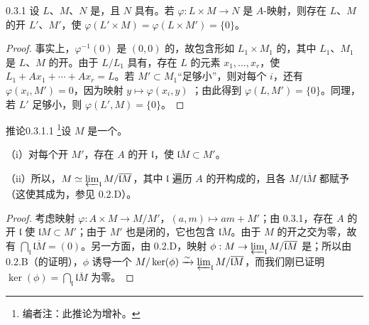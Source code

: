 \begin{SGAresult}{}{0.3.1}
设 $L$、$M$、$N$ 是，且 $N$ 具有。若 $\varphi:L\times M\to N$ 是 $A$-映射，则存在 $L$、$M$ 的开 $L'$、$M'$，使 $\varphi(L'\times M)=\varphi(L\times M')=\{0\}$。
\end{SGAresult}
\begin{proof}
事实上，$\varphi^{-1}(0)$ 是 $(0,0)$ 的，故包含形如 $L_1\times M_1$ 的，其中 $L_1$、$M_1$ 是 $L$、$M$ 的开。由于 $L/L_1$ 具有，存在 $L$ 的元素 $x_1,\ldots,x_r$，使 $L_1+Ax_1+\cdots+Ax_r=L$。若 $M'\subset M_1$“足够小”，则对每个 $i$，还有 $\varphi(x_i,M')=0$，因为映射 $y\mapsto\varphi(x_i,y)$ ；由此得到 $\varphi(L,M')=\{0\}$。同理，若 $L'$ 足够小，则 $\varphi(L',M)=\{0\}$。
\end{proof}
\begin{SGAresult}{推论}{0.3.1.1}
\footnote{编者注：此推论为增补。}设 $M$ 是一个。

（i）对每个开 $M'$，存在 $A$ 的开 $\mathfrak l$，使 $\overline{\mathfrak lM}\subset M'$。

（ii）所以，$M\simeq\varprojlim_{\mathfrak l}M/\overline{\mathfrak lM}$，其中 $\mathfrak l$ 遍历 $A$ 的开构成的，且各 $M/\overline{\mathfrak lM}$ 都赋予（这使其成为，参见 0.2.D）。
\end{SGAresult}
\begin{proof}
考虑映射 $\varphi:A\times M\to M/M'$，$(a,m)\mapsto am+M'$；由 0.3.1，存在 $A$ 的开 $\mathfrak l$ 使 $\mathfrak lM\subset M'$；由于 $M'$ 也是闭的，它也包含 $\overline{\mathfrak lM}$。由于 $M$ 的开之交为零，故有 $\bigcap_{\mathfrak l}\overline{\mathfrak lM}=(0)$。另一方面，由 0.2.D，映射 $\phi:M\to\varprojlim_{\mathfrak l}M/\overline{\mathfrak lM}$ 是；所以由 0.2.B（的证明），$\phi$ 诱导一个 $M/\ker(\phi)\xrightarrow{\sim}\varprojlim_{\mathfrak l}M/\overline{\mathfrak lM}$，而我们刚已证明 $\ker(\phi)=\bigcap_{\mathfrak l}\overline{\mathfrak lM}$ 为零。
\end{proof}

